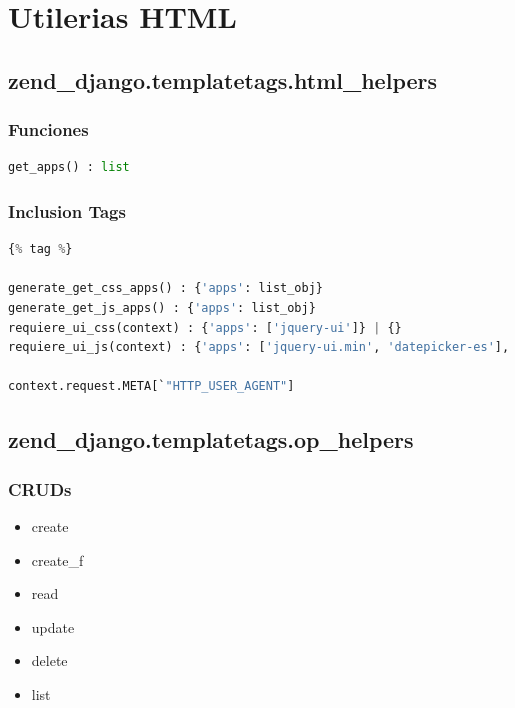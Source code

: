 \chapter{Utilerias HTML}

\section{zend\_django.templatetags.html\_helpers}

\subsection{Funciones}

\begin{lstlisting}[language=Python]
get_apps() : list
\end{lstlisting}

\subsection{Inclusion Tags}

\begin{lstlisting}[language=Python]
{% tag %}

generate_get_css_apps() : {'apps': list_obj}
generate_get_js_apps() : {'apps': list_obj}
requiere_ui_css(context) : {'apps': ['jquery-ui']} | {}
requiere_ui_js(context) : {'apps': ['jquery-ui.min', 'datepicker-es'], 'req_ui': True} | {}

context.request.META[`"HTTP_USER_AGENT"]
\end{lstlisting}

\section{zend\_django.templatetags.op\_helpers}

\subsection{CRUDs}

\begin{itemize}
	\item create
	\item create\_f
	\item read
	\item update
	\item delete
	\item list
\end{itemize}

